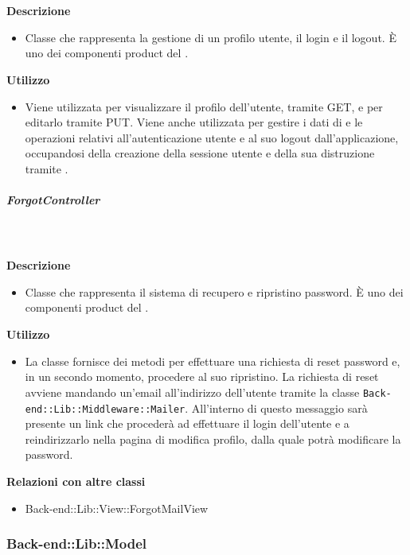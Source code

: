 				\textbf{\\ \\ Descrizione} 
					\begin{itemize}
						\item[] Classe che rappresenta la gestione di un profilo utente, il login e il logout. È uno dei componenti product del  .

					\end{itemize}      
				\textbf{Utilizzo}  
					\begin{itemize}
						\item[] Viene utilizzata per visualizzare il profilo dell'utente, tramite GET, e per editarlo tramite PUT. Viene anche utilizzata per gestire i dati di e le operazioni relativi all'autenticazione utente e al suo logout dall'applicazione, occupandosi della creazione della sessione utente e della sua distruzione tramite .
					\end{itemize}
			\subparagraph{ForgotController}
				
				\textbf{\\ \\ Descrizione} 
					\begin{itemize}
						\item[] Classe che rappresenta il sistema di recupero e ripristino password. È uno dei componenti product del  .
					\end{itemize}      
				\textbf{Utilizzo}  
					\begin{itemize}
						\item[] La classe fornisce dei metodi per effettuare una richiesta di reset password e, in un secondo momento, procedere al suo ripristino. La richiesta di reset avviene mandando un'email all'indirizzo dell'utente tramite la classe \texttt{Back-end::Lib::Middleware::Mailer}. All'interno di questo messaggio sarà presente un link che procederà ad effettuare il login dell'utente e a reindirizzarlo nella pagina di modifica profilo, dalla quale potrà modificare la password.
					\end{itemize}
					\textbf{Relazioni con altre classi}
					\begin{itemize}
							\item{Back-end::Lib::View::ForgotMailView}
					\end{itemize}
	\subsubsection{Back-end::Lib::Model}
